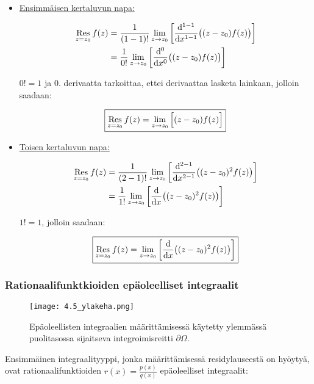 \documentclass[../integrointiopas.tex]{subfiles}
\begin{document}
	\begin{itemize}
		\item \underline{Ensimmäisen kertaluvun napa:}
		
		\begin{align}
			\res{z = z_0}f(z) &= \frac{1}{(1 - 1)!}\lim_{z\to z_0}\left[\odv{^{1 - 1}}{x^{1 - 1}}\big((z - z_0)f(z)\big)\right] \\
			&= \frac{1}{0!}\lim_{z\to z_0}\left[\odv{^0}{x^0}\big((z - z_0)f(z)\big)\right]
		\end{align}
	
		\noindent $0! = 1$ ja 0. derivaatta tarkoittaa, ettei derivaattaa lasketa lainkaan, jolloin saadaan:
		
		\begin{equation}
			\boxed{\underset{z = z_0}{\mathrm{Res}}\,f(z) = \lim_{z\to z_0}\Big[(z - z_0)f(z)\Big]}
		\end{equation}
	
		\item \underline{Toisen kertaluvun napa:}
		
		\begin{align}
			\res{z = z_0}f(z) &= \frac{1}{(2 - 1)!}\lim_{z\to z_0}\left[\odv{^{2 - 1}}{x^{2 - 1}}\big((z - z_0)^2f(z)\big)\right] \\
			&= \frac{1}{1!}\lim_{z\to z_0}\left[\odv{}{x}\big((z - z_0)^2f(z)\big)\right]
		\end{align}
	
		\noindent $1! = 1$, jolloin saadaan:
		
		\begin{equation}
			\boxed{\res{z = z_0}f(z) = \lim_{z\to z_0}\left[\odv{}{x}\big((z - z_0)^2f(z)\big)\right]}
		\end{equation}
	\end{itemize}

	
	\subsubsection{Rationaalifunktkioiden epäoleelliset integraalit}
	
	\begin{figure}[h!]
		\centering
		\texttt{[image: 4.5\_ylakeha.png]}
		\caption{Epäoleellisten integraalien määrittämisessä käytetty ylemmässä puolitasossa sijaitseva integroimisreitti $\partial\Omega$.}
	\end{figure}
	
	Ensimmäinen integraalityyppi, jonka määrittämisessä residylauseestä on hyöytyä, ovat rationaalifunktioiden $r(x) = \frac{p(x)}{q(x)}$ epäoleelliset integraalit:
	
\end{document}
